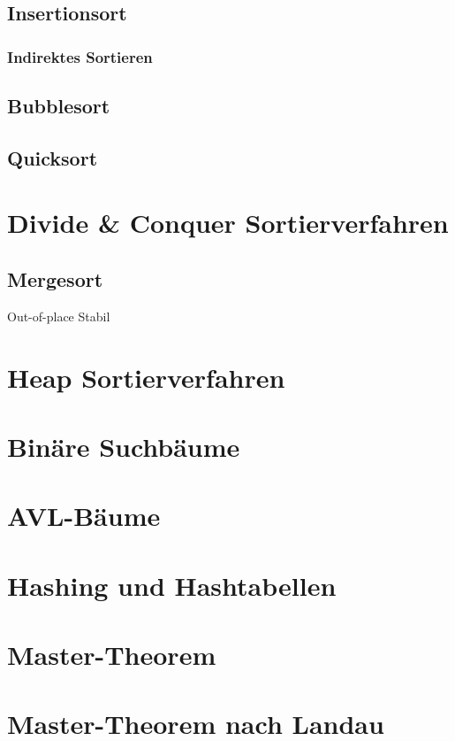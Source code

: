 \documentclass[12pt,a4paper]{article}
\begin{document}
\subsection{Insertionsort}

\subsubsection{Indirektes Sortieren}

\subsection{Bubblesort}

\subsection{Quicksort}

\section{Divide \& Conquer Sortierverfahren}

\subsection{Mergesort}
Out-of-place\newline
Stabil\newline

\section{Heap Sortierverfahren}

\section{Binäre Suchbäume}

\section{AVL-Bäume}

\section{Hashing und Hashtabellen}

\section{Master-Theorem}

\section{Master-Theorem nach Landau}
\label{sec:MasterLandau}
\end{document}
